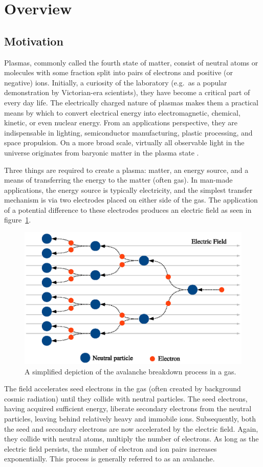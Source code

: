 \section{Overview}

\subsection{Motivation}
Plasmas, commonly called the fourth state of matter, consist of neutral atoms or
molecules with some fraction split into pairs of electrons and positive (or
negative) ions. Initially, a curiosity of the laboratory (e.g.\ as a popular
demonstration by Victorian-era scientists), they have become a critical part of
every day life. The electrically charged nature of plasmas makes them a
practical means by which to convert electrical energy into electromagnetic,
chemical, kinetic, or even nuclear energy. From an applications perspective,
they are indispensable in lighting, semiconductor manufacturing, plastic
processing, and space propulsion. On a more broad scale, virtually all
observable light in the universe originates from baryonic matter in the plasma
state \cite{NA2007}.

Three things are required to create a plasma: matter, an energy source, and a
means of transferring the energy to the matter (often gas). In man-made
applications, the energy source is typically electricity, and the simplest
transfer mechanism is via two electrodes placed on either side of the gas. The
application of a potential difference to these electrodes produces an electric
field as seen in figure~\ref{fig:avalanche}.
\begin{figure}
  \centering
  \includegraphics{./chapters/introduction/figures/avalanche.eps}
  \caption{A simplified depiction of the avalanche breakdown process in a gas.}
  \label{fig:avalanche}
\end{figure}
The field accelerates seed electrons in the gas (often created by background
cosmic radiation) until they collide with neutral particles. The seed electrons,
having acquired sufficient energy, liberate secondary electrons from the neutral
particles, leaving behind relatively heavy and immobile ions. Subsequently, both
the seed and secondary electrons are now accelerated by the electric field.
Again, they collide with neutral atoms, multiply the number of electrons. As
long as the electric field persists, the number of electron and ion pairs
increases exponentially. This process is generally referred to as an avalanche.

